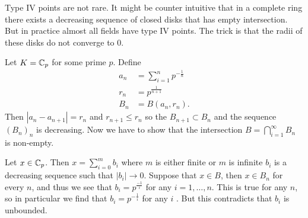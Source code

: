 Type IV points are not rare. It might be counter intuitive that in a complete ring there exists a decreasing sequence of closed disks that has empty intersection. 
But in practice almost all fields have type  IV points. 
The trick is that the radii of these disks do not converge to $0$. 
\begin{example}\label{ex:type4point}
	Let $K = \mathbb{C}_p$ for some prime $p$. 
	Define 
	\begin{align*}
		a_n &= \sum_{i = 1}^{n} p^{-\frac{1}{n}}\\
		r_n &= p^{\frac{1}{n + 1}} \\
		B_n &= B(a_n, r_n) 
.\end{align*}
Then $|a_n - a_{n + 1}| = r_n$ and $r_{n + 1} \le r_n$ so the $B_{n + 1} \subset B_n$ and the sequence $(B_n)_n$ is decreasing. 
Now we have to show that the intersection $B = \bigcap_{i = 1} ^{\infty} B_n$ is non-empty. 

Let $x \in \mathbb{C}_p$. Then $x = \sum_{i = 0}^{m} b_i$ where $m$ is either finite or $m$ is infinite $b_i$ is a decreasing sequence such that $|b_i| \to 0$. Suppose that  $x \in B$, then $x \in B_n$ for every $n$, and thus we see that  $b_i = p^{\frac{-1}{i}}$ for any $i = 1, \ldots, n$.  
This is true for any $n $, so in particular we find that $b_i = p^{-\frac{1}{i}}$ for any $i$ .
But this contradicts that $b_i$ is unbounded. 
\end{example}












